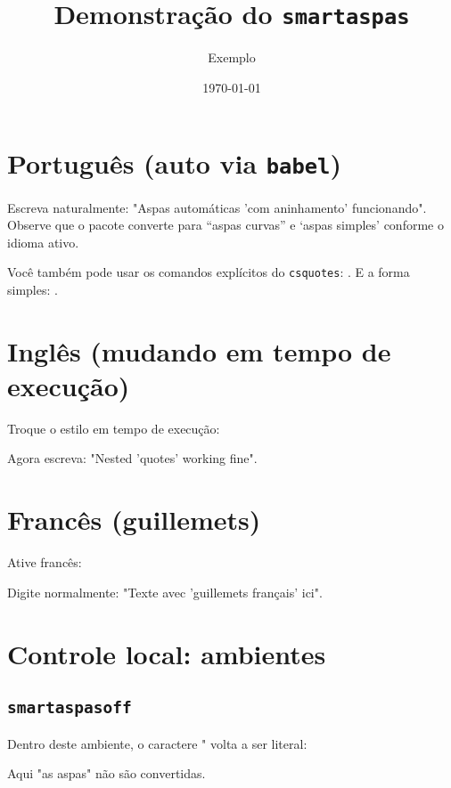 \documentclass[a4paper,12pt]{article}
\title{Demonstração do \texttt{smartaspas}}
\author{Exemplo}
\date{\today}
\begin{document}
\maketitle

\section{Português (auto via \texttt{babel})}
Escreva naturalmente: "Aspas automáticas 'com aninhamento' funcionando".
Observe que o pacote converte para “aspas curvas” e ‘aspas simples’ conforme o idioma ativo.

\medskip
Você também pode usar os comandos explícitos do \texttt{csquotes}:
.
E a forma simples: .

\section{Inglês (mudando em tempo de execução)}
Troque o estilo em tempo de execução:

Agora escreva: "Nested 'quotes' working fine".

\section{Francês (guillemets)}
Ative francês:

Digite normalmente: "Texte avec 'guillemets fran\c{c}ais' ici".


\section{Controle local: ambientes}
\subsection{\texttt{smartaspasoff}}
Dentro deste ambiente, o caractere " volta a ser literal:
\begin{smartaspasoff}
Aqui "as aspas" n\~ao s\~ao convertidas.
\end{smartaspasoff}
\end{document}
